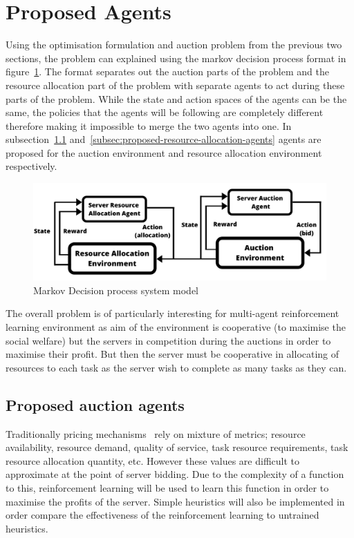 \section{Proposed Agents}\label{sec:proposed-agents}
Using the optimisation formulation and auction problem from the previous two sections, the problem can explained
using the markov decision process format in figure~\ref{fig:mdp_system_model}. The format separates out the auction
parts of the problem and the resource allocation part of the problem with separate agents to act during these
parts of the problem. While the state and action spaces of the agents can be the same, the policies that the agents
will be following are completely different therefore making it impossible to merge the two agents into one.
In subsection~\ref{subsec:proposed-auction-agents} and~\ref{subsec:proposed-resource-allocation-agents} agents are
proposed for the auction environment and resource allocation environment respectively.

\begin{figure}
    \centering
    \includegraphics{figures/flexible_resource_allocation_env.pdf}
    \caption{Markov Decision process system model}
    \label{fig:mdp_system_model}
\end{figure}

The overall problem is of particularly interesting for multi-agent reinforcement learning environment as aim of the
environment is cooperative (to maximise the social welfare) but the servers in competition during the auctions
in order to maximise their profit. But then the server must be cooperative in allocating of resources to each task
as the server wish to complete as many tasks as they can.

\subsection{Proposed auction agents}\label{subsec:proposed-auction-agents}
Traditionally pricing mechanisms~\citep{al2013cloud} rely on mixture of metrics; resource availability, resource demand,
quality of service, task resource requirements, task resource allocation quantity, etc. However these values are
difficult to approximate at the point of server bidding. Due to the complexity of a function to this, reinforcement
learning will be used to learn this function in order to maximise the profits of the server. Simple heuristics will
also be implemented in order compare the effectiveness of the reinforcement learning to untrained heuristics.

